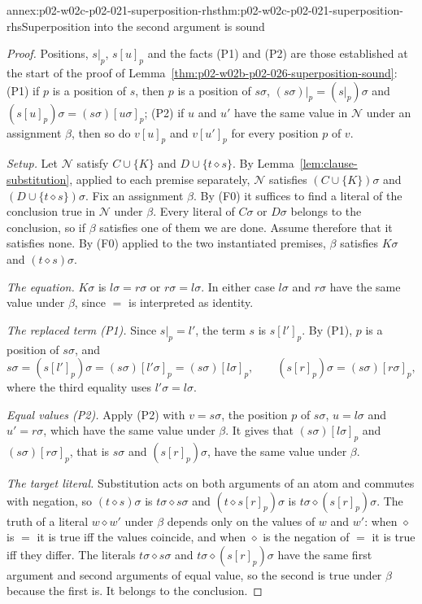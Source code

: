 \begin{annexitem}{annex:p02-w02c-p02-021-superposition-rhs}{thm:p02-w02c-p02-021-superposition-rhs}{Superposition into the second argument is sound}
\begin{proof}
Positions, \(s|_p\), \(s[u]_p\) and the facts (P1) and (P2) are those
established at the start of the proof of
Lemma~\ref{thm:p02-w02b-p02-026-superposition-sound}: (P1) if \(p\) is a
position of \(s\), then \(p\) is a position of \(s\sigma\),
\((s\sigma)|_p=(s|_p)\sigma\) and \((s[u]_p)\sigma=(s\sigma)[u\sigma]_p\); (P2)
if \(u\) and \(u'\) have the same value in \(\mathcal N\) under an assignment
\(\beta\), then so do \(v[u]_p\) and \(v[u']_p\) for every position \(p\) of
\(v\).

\emph{Setup.}  Let \(\mathcal N\) satisfy \(C\cup\{K\}\) and
\(D\cup\{t\mathrel{\diamond}s\}\).  By Lemma~\ref{lem:clause-substitution},
applied to each premise separately, \(\mathcal N\) satisfies
\((C\cup\{K\})\sigma\) and \((D\cup\{t\mathrel{\diamond}s\})\sigma\).  Fix an
assignment \(\beta\).  By (F0) it suffices to find a literal of the conclusion
true in \(\mathcal N\) under \(\beta\).  Every literal of \(C\sigma\) or
\(D\sigma\) belongs to the conclusion, so if \(\beta\) satisfies one of them
we are done.  Assume therefore that it satisfies none.  By (F0) applied to the
two instantiated premises, \(\beta\) satisfies \(K\sigma\) and
\((t\mathrel{\diamond}s)\sigma\).

\emph{The equation.}  \(K\sigma\) is \(l\sigma=r\sigma\) or
\(r\sigma=l\sigma\).  In either case \(l\sigma\) and \(r\sigma\) have the
same value under \(\beta\), since \(=\) is interpreted as identity.

\emph{The replaced term (P1).}  Since \(s|_p=l'\), the term \(s\) is
\(s[l']_p\).  By (P1), \(p\) is a position of \(s\sigma\), and
\[
 s\sigma=(s[l']_p)\sigma=(s\sigma)[l'\sigma]_p=(s\sigma)[l\sigma]_p,
 \qquad
 (s[r]_p)\sigma=(s\sigma)[r\sigma]_p,
\]
where the third equality uses \(l'\sigma=l\sigma\).

\emph{Equal values (P2).}  Apply (P2) with \(v=s\sigma\), the position \(p\)
of \(s\sigma\), \(u=l\sigma\) and \(u'=r\sigma\), which have the same value
under \(\beta\).  It gives that \((s\sigma)[l\sigma]_p\) and
\((s\sigma)[r\sigma]_p\), that is \(s\sigma\) and \((s[r]_p)\sigma\), have the
same value under \(\beta\).

\emph{The target literal.}  Substitution acts on both arguments of an atom
and commutes with negation, so \((t\mathrel{\diamond}s)\sigma\) is
\(t\sigma\mathrel{\diamond}s\sigma\) and
\((t\mathrel{\diamond}s[r]_p)\sigma\) is
\(t\sigma\mathrel{\diamond}(s[r]_p)\sigma\).  The truth of a literal
\(w\mathrel{\diamond}w'\) under \(\beta\) depends only on the values of \(w\)
and \(w'\): when \(\diamond\) is \(=\) it is true iff the values coincide, and
when \(\diamond\) is the negation of \(=\) it is true iff they differ.  The
literals \(t\sigma\mathrel{\diamond}s\sigma\) and
\(t\sigma\mathrel{\diamond}(s[r]_p)\sigma\) have the same first argument and
second arguments of equal value, so the second is true under \(\beta\)
because the first is.  It belongs to the conclusion.


\end{proof}
\end{annexitem}
